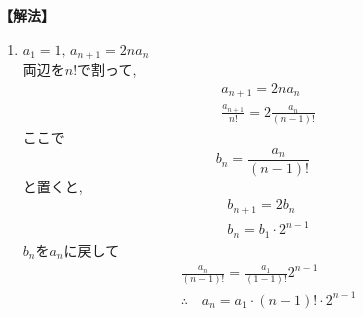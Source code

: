       \noindent\textbf{【解法】}
      \begin{enumerate}[label=(\arabic*),parsep=3pt]
        \item $\displaystyle a_1=1,\, a_{n+1}=2na_n$\\
              両辺を$n!$で割って,
              \begin{align*}
                &a_{n+1}=2na_n\\
                &\frac{a_{n+1}}{n!}=2\frac{a_n}{(n-1)!}
              \end{align*}
              ここで
              \[
                b_n=\frac{a_n}{(n-1)!}
              \]
              と置くと,
              \begin{align*} 
                &b_{n+1}=2b_n\\
                &b_n=b_1\cdot 2^{n-1}
              \end{align*}
              $b_n$を$a_n$に戻して
              \begin{align*} 
                &\frac{a_n}{(n-1)!}=\frac{a_1}{(1-1)!}2^{n-1}\\
                &\therefore \quad a_n=a_1 \cdot (n-1)! \cdot 2^{n-1}
              \end{align*}
              

\end{enumerate}
